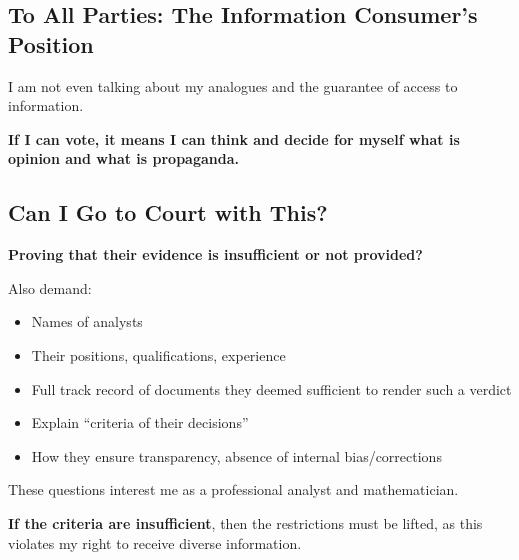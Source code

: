 \documentclass[11pt,a4paper]{article}
\theoremstyle{definition}
\theoremstyle{remark}
\begin{document}
\subsection{To All Parties: The Information Consumer's Position}

\begin{center}
\end{center}

I am not even talking about my analogues and the guarantee of access to information.

\textbf{If I can vote, it means I can think and decide for myself what is opinion and what is propaganda.}

\subsection{Can I Go to Court with This?}

\textbf{Proving that their evidence is insufficient or not provided?}

Also demand:
\begin{itemize}
\item Names of analysts
\item Their positions, qualifications, experience
\item Full track record of documents they deemed sufficient to render such a verdict
\item Explain ``criteria of their decisions''
\item How they ensure transparency, absence of internal bias/corrections
\end{itemize}

These questions interest me as a professional analyst and mathematician.

\textbf{If the criteria are insufficient}, then the restrictions must be lifted, as this violates my right to receive diverse information.
\end{document}
